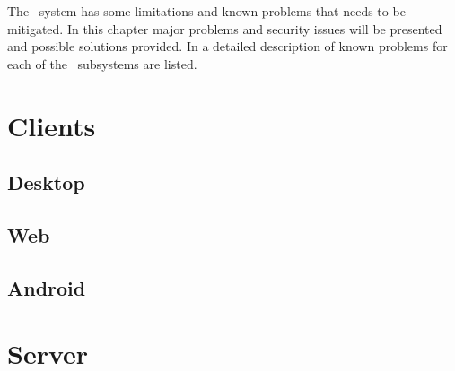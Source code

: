The \appName\ system has some limitations and known problems that needs to be
mitigated. In this chapter major problems and security issues will be presented
and possible solutions provided. In  a detailed
description of known problems for each of the \appName\ subsystems are listed.

\section{Clients}
\subsection{Desktop}
\FloatBarrier
\subsection{Web}

\FloatBarrier
\subsection{Android}
\section{Server}

